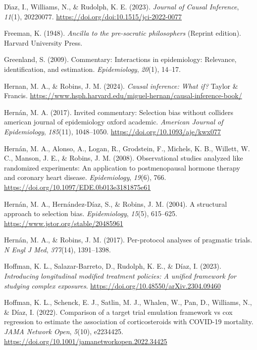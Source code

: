 \documentclass[
  single column]{article}
\newlength{\cslhangindent}
\newenvironment{CSLReferences}[2] %
 {\begin{list}{}{%
  \setlength{\itemindent}{0pt}
  \setlength{\leftmargin}{0pt}
  \setlength{\parsep}{0pt}
  \ifodd #1
   \setlength{\leftmargin}{\cslhangindent}
   \setlength{\itemindent}{-1\cslhangindent}
  \fi
  \setlength{\itemsep}{#2\baselineskip}}}
 {\end{list}}
\begin{document}
\begin{CSLReferences}{1}{0}
Dı́az, I., Williams, N., \& Rudolph, K. E. (2023). \emph{Journal of
Causal Inference}, \emph{11}(1), 20220077.
\url{https://doi.org/doi:10.1515/jci-2022-0077}

Freeman, K. (1948). \emph{Ancilla to the pre-socratic philosophers}
(Reprint edition). Harvard University Press.

Greenland, S. (2009). Commentary: Interactions in epidemiology:
Relevance, identification, and estimation. \emph{Epidemiology},
\emph{20}(1), 14--17.

Hernan, M. A., \& Robins, J. M. (2024). \emph{Causal inference: What
if?} Taylor \& Francis.
\url{https://www.hsph.harvard.edu/miguel-hernan/causal-inference-book/}

Hernán, M. A. (2017). Invited commentary: Selection bias without
colliders \textbar{} american journal of epidemiology \textbar{} oxford
academic. \emph{American Journal of Epidemiology}, \emph{185}(11),
1048--1050. \url{https://doi.org/10.1093/aje/kwx077}

Hernán, M. A., Alonso, A., Logan, R., Grodstein, F., Michels, K. B.,
Willett, W. C., Manson, J. E., \& Robins, J. M. (2008). Observational
studies analyzed like randomized experiments: An application to
postmenopausal hormone therapy and coronary heart disease.
\emph{Epidemiology}, \emph{19}(6), 766.
\url{https://doi.org/10.1097/EDE.0b013e3181875e61}

Hernán, M. A., Hernández-Díaz, S., \& Robins, J. M. (2004). A structural
approach to selection bias. \emph{Epidemiology}, \emph{15}(5), 615--625.
\url{https://www.jstor.org/stable/20485961}

Hernán, M. A., \& Robins, J. M. (2017). Per-protocol analyses of
pragmatic trials. \emph{N Engl J Med}, \emph{377}(14), 1391--1398.

Hoffman, K. L., Salazar-Barreto, D., Rudolph, K. E., \& Díaz, I. (2023).
\emph{Introducing longitudinal modified treatment policies: A unified
framework for studying complex exposures}.
\url{https://doi.org/10.48550/arXiv.2304.09460}

Hoffman, K. L., Schenck, E. J., Satlin, M. J., Whalen, W., Pan, D.,
Williams, N., \& Díaz, I. (2022). Comparison of a target trial emulation
framework vs cox regression to estimate the association of
corticosteroids with COVID-19 mortality. \emph{JAMA Network Open},
\emph{5}(10), e2234425.
\url{https://doi.org/10.1001/jamanetworkopen.2022.34425}


\end{CSLReferences}
\end{document}
